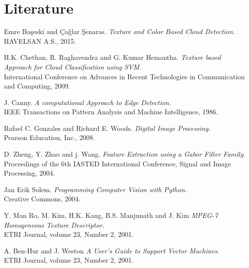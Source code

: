 \documentclass{article}
\begin{document}
\section{Literature}
\renewcommand{\section}[2]{}%
\begin{thebibliography}{9}

Emre Ba\c{s}eski and \c{C}a\v{g}lar \c{S}enaras. 
\textit{Texture and Color Based Cloud Detection.}
HAVELSAN A.S., 2015.
 
H.K. Chethan, R. Raghavendra and G. Kumar Hemantha. 
\textit{Texture based Approach for Cloud Classification using SVM.} \\
International Conference on Advances in Recent Technologies in Communication and Computing, 2009. 
 
J. Canny. 
\textit{A computational Approach to Edge Detection.} \\
IEEE Transactions on Pattern Analysis and Machine Intelligence, 1986. 
 
Rafael C. Gonzales and Richard E. Woods. 
\textit{Digital Image Processing.} \\
Pearson Education, Inc., 2008.
 
D. Zheng, Y. Zhao and j. Wang. 
\textit{Feature Extraction using a Gabor Filter Family.} \\
Proceedings of the 6th IASTED International Conference, Signal and Image Processing, 2004. 

Jan Erik Solem. 
\textit{Programming Computer Vision with Python.} \\
Creative Commons, 2004.

Y. Man Ro, M. Kim, H.K. Kang, B.S. Manjunath and J. Kim
\textit{MPEG-7 Homogeneous Texture Descriptor.} \\
ETRI Journal, volume 23, Number 2, 2001. 

A. Ben-Hur and J. Weston
\textit{A User's Guide to Support Vector Machines.} \\
ETRI Journal, volume 23, Number 2, 2001. 

\end{thebibliography}

%
\end{document}
